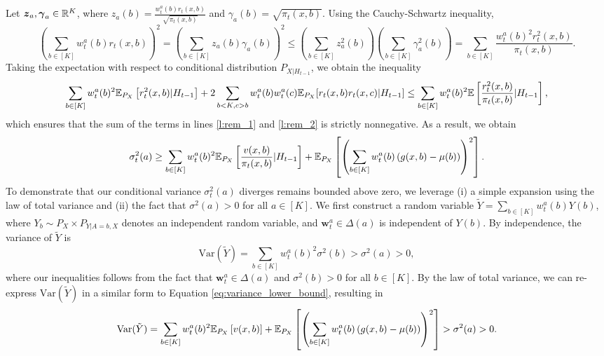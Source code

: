 \documentclass{article}
\begin{document}
\begin{appendices}
Let $\boldsymbol{z}_a, \boldsymbol{\gamma}_a \in \mathbb{R}^K$, where $z_a(b) = \frac{w_t^a(b)r_t(x,b) }{\sqrt{\pi_t(x,b)}}$ and $\gamma_a(b) = \sqrt{\pi_t(x,b)}$. Using the Cauchy-Schwartz inequality,
\begin{equation}
     \left(\sum_{b \in [K]} w_t^a(b) r_t(x,b)\right)^2 = \left(\sum_{b \in [K]} z_a(b) \gamma_a(b) \right)^2\leq  \left(\sum_{b \in [K]} z_a^2(b)\right) \left(\sum_{b \in [K]} \gamma_a^2(b)\right) = \sum_{b \in [K]}\frac{w_t^a(b)^2r_t^2(x,b)}{\pi_t(x,b)}.
\end{equation}
Taking the expectation with respect to conditional distribution $P_{X|H_{t-1}}$, we obtain the inequality
\begin{equation}
    \sum_{b \in [K]} w_t^a(b)^2\mathbb{E}_{P_X}\left[ r_t^2(x,b) |H_{t-1}\right] + 2\sum_{b< K, c > b }w_t^a(b) w_t^a(c)\mathbb{E}_{P_X}[r_t(x,b)r_t(x,c)|H_{t-1}] \leq \sum_{b \in [K]}w_t^a(b)^2\mathbb{E}\left[\frac{r_t^2(x,b)}{\pi_t(x,b)} | H_{t-1} \right],
\end{equation}
which ensures that the sum of the terms in lines \eqref{l:rem_1} and \eqref{l:rem_2} is strictly nonnegative. As a result, we obtain
\begin{equation}\label{eq:variance_lower_bound}
    \sigma_t^2(a) \geq \sum_{b \in [K]}w_t^a(b)^2 \mathbb{E}_{P_X}\left[\frac{v(x,b)}{\pi_t(x,b)} | H_{t-1}\right] 
         + \mathbb{E}_{P_X}\left[\left(\sum_{b \in [K]}w_t^a(b) \left(g(x,b) - \mu(b)\right) \right)^2 \right].
\end{equation}
To demonstrate that our conditional variance $\sigma^2_t(a)$ diverges remains bounded above zero, we leverage (i) a simple expansion using the law of total variance and (ii) the fact that $\sigma^2(a) > 0$ for all $a\in [K]$. We first construct a random variable $\tilde{Y} = \sum_{b \in [K]} w_t^a(b) Y(b)$, where $Y_b \sim P_X \times P_{Y|A=b, X}$ denotes an independent random variable, and $\bm{w}_t^a \in \Delta(a)$ is independent of $Y(b)$. By independence, the variance of $\tilde{Y}$ is 
\begin{equation}
    \text{Var}(\tilde{Y}) = \sum_{b \in [K]} w_t^a(b)^2 \sigma^2(b) > \sigma^2(a)> 0,
\end{equation}
where our inequalities follows from the fact that $\bm{w}_t^a \in \Delta(a)$ and $\sigma^2(b) > 0$ for all $b\in [K]$. By the law of total variance, we can re-express $\text{Var}(\tilde{Y})$ in a similar form to Equation \eqref{eq:variance_lower_bound}, resulting in 
\begin{equation}
    \text{Var}(\tilde{Y}) = \sum_{b \in [K]}w_t^a(b)^2 \mathbb{E}_{P_X}\left[v(x,b)\right] 
         + \mathbb{E}_{P_X}\left[\left(\sum_{b \in [K]}w_t^a(b) \left(g(x,b) - \mu(b)\right) \right)^2 \right] > \sigma^2(a) > 0.
\end{equation}


\end{appendices}
\end{document}
